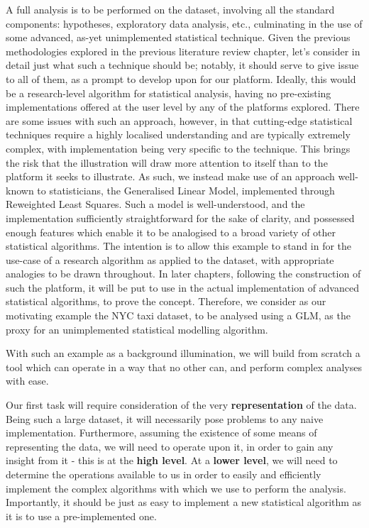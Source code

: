 A full analysis is to be performed on the dataset, involving all the standard components: hypotheses, exploratory data analysis, etc., culminating in the use of some advanced, as-yet unimplemented statistical technique.
Given the previous methodologies explored in the previous literature review chapter, let's consider in detail just what such a technique should be; notably, it should serve to give issue to all of them, as a prompt to develop upon for our platform.
Ideally, this would be a research-level algorithm for statistical analysis, having no pre-existing implementations offered at the user level by any of the platforms explored.
There are some issues with such an approach, however, in that cutting-edge statistical techniques require a highly localised understanding and are typically extremely complex, with implementation being very specific to the technique.
This brings the risk that the illustration will draw more attention to itself than to the platform it seeks to illustrate.
As such, we instead make use of an approach well-known to statisticians, the Generalised Linear Model, implemented through Reweighted Least Squares.
Such a model is well-understood, and the implementation sufficiently straightforward for the sake of clarity, and possessed enough features which enable it to be analogised to a broad variety of other statistical algorithms.
The intention is to allow this example to stand in for the use-case of a research algorithm as applied to the dataset, with appropriate analogies to be drawn throughout.
In later chapters, following the construction of such the platform, it will be put to use in the actual implementation of advanced statistical algorithms, to prove the concept.
Therefore, we consider as our motivating example the NYC taxi dataset, to be analysed using a GLM, as the proxy for an unimplemented statistical modelling algorithm.

With such an example as a background illumination, we will build from scratch a tool which can operate in a way that no other can, and perform complex analyses with ease.

Our first task will require consideration of the very \textbf{representation} of the data.
Being such a large dataset, it will necessarily pose problems to any naive implementation.
Furthermore, assuming the existence of some means of representing the data, we will need to operate upon it, in order to gain any insight from it - this is at the \textbf{high level}.
At a \textbf{lower level}, we will need to determine the operations available to us in order to easily and efficiently implement the complex algorithms with which we use to perform the analysis.
Importantly, it should be just as easy to implement a new statistical algorithm as it is to use a pre-implemented one.

